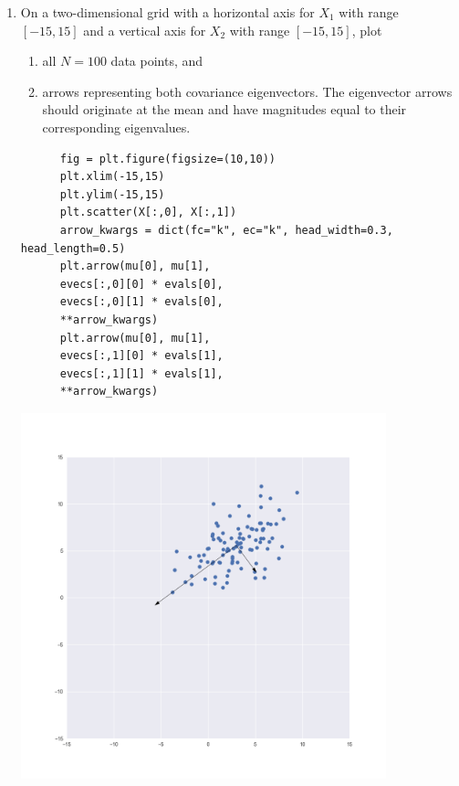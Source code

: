 \documentclass{article}
\begin{document}
\begin{enumerate}[label=(\alph*)]
\newpage
\item On a two-dimensional grid with a horizontal axis for $X_1$ with range $[-15, 15]$ and a vertical axis for $X_2$ with range $[-15, 15]$, plot
  \begin{enumerate}[label=(\roman*)]
  \item all $N=100$ data points, and
  \item arrows representing both covariance eigenvectors. The eigenvector arrows should originate at the mean and have magnitudes equal to their corresponding eigenvalues.
  \end{enumerate}
  \begin{mdframed}
    \begin{verbatim}
      fig = plt.figure(figsize=(10,10))
      plt.xlim(-15,15)
      plt.ylim(-15,15)
      plt.scatter(X[:,0], X[:,1])
      arrow_kwargs = dict(fc="k", ec="k", head_width=0.3, head_length=0.5)
      plt.arrow(mu[0], mu[1],
      evecs[:,0][0] * evals[0],
      evecs[:,0][1] * evals[0],
      **arrow_kwargs)
      plt.arrow(mu[0], mu[1],
      evecs[:,1][0] * evals[1],
      evecs[:,1][1] * evals[1],
      **arrow_kwargs)
    \end{verbatim}
    \includegraphics[width=300pt]{img/hw03_3d.png}
  \end{mdframed}


\end{enumerate}
\end{document}
